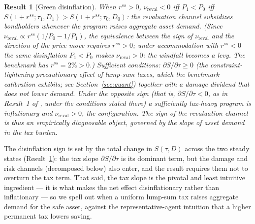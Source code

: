 \documentclass[12pt]{article}
\newtheorem{result}{Result}
\newcommand{\Sfun}{S}
\begin{document}
\begin{result}[Green disinflation]\label{res:disinflation}
When $r^{ss}>0$, $\nu_{\mathrm{reval}}<0$ iff $P_1<P_0$ iff
$\Sfun(1+r^{ss};\tau_1,D_1) > \Sfun(1+r^{ss};\tau_0,D_0)$: the revaluation
channel subsidizes bondholders whenever the program raises aggregate
asset demand. (Since $\nu_{\mathrm{reval}}\propto r^{ss}(1/P_0-1/P_1)$, the
equivalence between the sign of $\nu_{\mathrm{reval}}$ and the direction of
the price move requires $r^{ss}>0$; under accommodation with $r^{ss}<0$ the
same disinflation $P_1<P_0$ makes $\nu_{\mathrm{reval}}>0$: the windfall
becomes a levy. The benchmark has $r^{ss}=2\%>0$.) Sufficient conditions: $\partial\Sfun/\partial\tau\ge0$
(the constraint-tightening precautionary effect of lump-sum taxes, which the
benchmark calibration exhibits; see Section~\ref{sec:quant}) together with a
damage dividend that does not lower demand. Under the opposite sign
(that is, $\partial\Sfun/\partial\tau<0$, as in Result~1 of
\citealp{hagedorn2026dtpl}, under the conditions stated there) a
sufficiently tax-heavy program is inflationary and
$\nu_{\mathrm{reval}}>0$, the \citet{angeletos2024deficits} configuration.
The sign of the revaluation channel is thus an empirically diagnosable
object, governed by the slope of asset demand in the tax burden.
\end{result}

The disinflation sign is set by the total change in $\Sfun(\tau,D)$
across the two steady states (Result~\ref{res:disinflation}): the tax slope
$\partial\Sfun/\partial\tau$ is its dominant term, but the damage and risk
channels (decomposed below) also enter, and the result requires them not to
overturn the tax term. That said, the tax slope is the pivotal and least
intuitive ingredient --- it is what makes the net effect disinflationary
rather than inflationary --- so we spell out when a
uniform lump-sum tax raises aggregate demand for the safe asset,
against the representative-agent intuition that a higher permanent tax lowers
saving.
\end{document}
